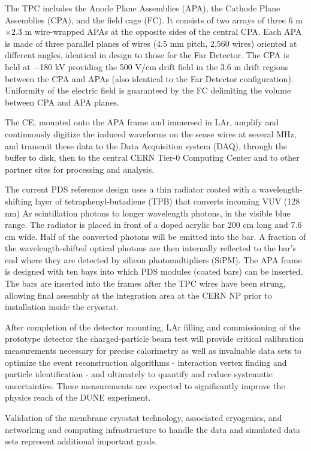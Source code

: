 The TPC includes the Anode Plane Assemblies (APA), the Cathode Plane Assemblies (CPA), and the field cage (FC). It consists of two arrays of three 6 m$\times$2.3 m wire-wrapped APAs at the opposite sides of the central CPA. Each APA is made of three parallel planes of wires (4.5 mm pitch, 2,560 wires) oriented at different angles, identical in design to those for the Far Detector. The CPA is held at $-$180 kV providing the 500 V/cm drift field in the 3.6 m drift regions between the CPA and APAs (also identical to the Far Detector configuration). Uniformity of the electric field is guaranteed by the FC delimiting the volume between CPA and APA planes.

The CE, mounted onto the APA frame and immersed in LAr, amplify and continuously digitize the induced waveforms on the sense wires at several MHz, and transmit these data to the Data Acquisition system (DAQ), through the buffer to disk, then to the central CERN Tier-0 Computing Center and to other partner sites for processing and analysis.  

The current PDS reference design uses a thin radiator coated with a wavelength-shifting layer of tetraphenyl-butadiene (TPB) that converts incoming VUV (128 nm) Ar scintillation photons to longer wavelength photons, in the visible blue range. The radiator is placed in front of a doped acrylic bar 200 cm long and 7.6 cm wide. Half of the converted photons will be emitted into the bar. A fraction of the wavelength-shifted optical photons are then internally reflected to the bar's end where they are detected by silicon photomultipliers (SiPM).
The APA frame is designed with ten bays into which PDS modules (coated bars) can be inserted. The bars are inserted into the frames after the TPC wires have been strung, allowing final assembly at the integration area at the CERN NP prior to installation inside the cryostat. 

After completion of the detector mounting, LAr filling and commissioning of the prototype detector the charged-particle beam test will provide critical calibration measurements necessary for precise calorimetry as well as invaluable data sets to optimize the event reconstruction algorithms - interaction vertex finding and particle identification - and ultimately to quantify and reduce systematic uncertainties. These measurements are expected to significantly improve the physics reach of the DUNE experiment.

Validation of the membrane cryostat technology, associated cryogenics, and networking and computing infrastructure to handle the data and simulated data sets represent additional important goals. 

